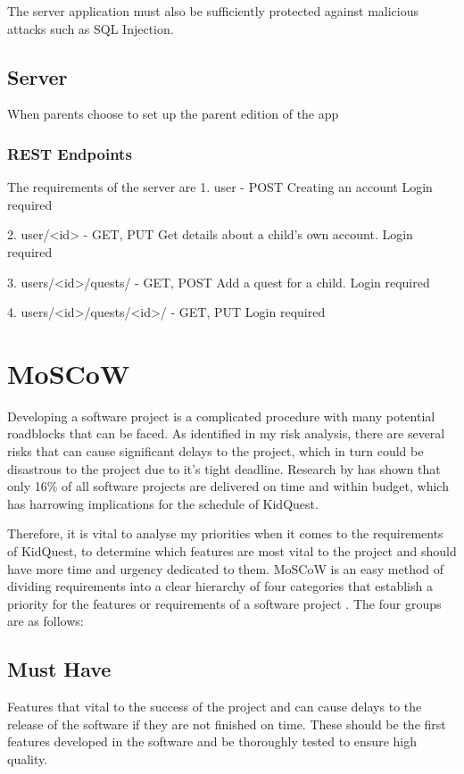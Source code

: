The server application must also be sufficiently protected against malicious attacks such as SQL Injection.

\subsection{Server}
When parents choose to set up the parent edition of the app

\subsubsection{REST Endpoints}
The requirements of the server are 	 	
1. user - POST
Creating an account
Login required

2. user/<id> - GET, PUT
Get details about a child's own account.
Login required

3. users/<id>/quests/ - GET, POST
Add a quest for a child.
Login required

4. users/<id>/quests/<id>/ - GET, PUT
Login required

\section{MoSCoW}
Developing a software project is a complicated procedure with many potential roadblocks that can be faced.
As identified in my risk analysis, there are several risks that can cause significant delays to the project, which in turn could be disastrous to the project due to it's tight deadline.
Research by \cite{requirementsprioritization} has shown that only 16\% of all software projects are delivered on time and within budget, which has harrowing implications for the schedule of KidQuest.

Therefore, it is vital to analyse my priorities when it comes to the requirements of KidQuest, to determine which features are most vital to the project and should have more time and urgency dedicated to them.
MoSCoW is an easy method of dividing requirements into a clear hierarchy of four categories that establish a priority for the features or requirements of a software project \citep[p.517]{hatton2008choosing}.
The four groups are as follows:

\subsection{Must Have}
Features that vital to the success of the project and can cause delays to the release of the software if they are not finished on time.
These should be the first features developed in the software and be thoroughly tested to ensure high quality.

